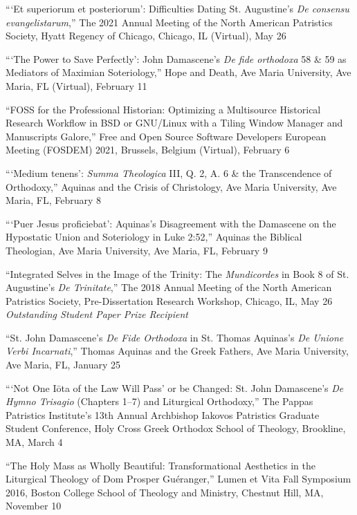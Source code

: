 \documentclass[letterpaper,12pt]{article}
\newcommand{\years}[1]{%
  {\reversemarginpar\strut\marginnote{{\small#1}}}%
}
\begin{document}
{{{{{{{{%
\years{2021}%
%
```Et superiorum et posteriorum': Difficulties Dating St. Augustine's \emph{De consensu evangelistarum},'' The 2021 Annual Meeting of the North American Patristics Society, Hyatt Regency of Chicago, Chicago, IL (Virtual), May 26 \\ [.3cm]
%
\years{2021}%
%
```The Power to Save Perfectly': John Damascene's \emph{De fide orthodoxa} 58 \& 59 as Mediators of Maximian Soteriology,'' Hope and Death, Ave Maria University, Ave Maria, FL (Virtual), February 11 \\ [.3cm]
%
\years{2021}%
%
``FOSS for the Professional Historian: Optimizing a Multisource Historical Research Workflow in BSD or GNU/Linux with a Tiling Window Manager and Manuscripts Galore,'' Free and Open Source Software Developers European Meeting (FOSDEM) 2021, Brussels, Belgium (Virtual), February 6 \\ [.3cm]
%
\years{2020}%
%
```Medium tenens': \emph{Summa Theologica} III, Q. 2, A. 6 \& the Transcendence of Orthodoxy,'' Aquinas and the Crisis of Christology, Ave Maria University, Ave Maria, FL, February 8 \\ [.3cm]
%
\years{2019}%
%
```Puer Jesus proficiebat': Aquinas's Disagreement with the Damascene on the Hypostatic Union and Soteriology in Luke 2:52,'' Aquinas the Biblical Theologian, Ave Maria University, Ave Maria, FL, February 9 \\ [.3cm]
%
\years{2018}%
%
``Integrated Selves in the Image of the Trinity: The \emph{Mundicordes} in Book 8 of St. Augustine's \emph{De Trinitate},'' The 2018 Annual Meeting of the North American Patristics Society, Pre-Dissertation Research Workshop, Chicago, IL, May 26 \\
\hfill\emph{Outstanding Student Paper Prize Recipient} \\ [.3cm]
%
\years{2018}%
%
``St. John Damascene's \emph{De Fide Orthodoxa} in St. Thomas Aquinas's \emph{De Unione Verbi Incarnati},'' Thomas Aquinas and the Greek Fathers, Ave Maria University, Ave Maria, FL, January 25 \\ [.3cm]
%
\years{2017}%
%
```Not One I\=ota of the Law Will Pass' or be Changed: St. John Damascene's \emph{De Hymno Trisagio} (Chapters 1–7) and Liturgical Orthodoxy,'' The Pappas Patristics Institute's 13th Annual Archbishop Iakovos Patristics Graduate Student Conference, Holy Cross Greek Orthodox School of Theology, Brookline, MA, March 4 \\ [.3cm]
%
\years{2017}%
%
``The Holy Mass as Wholly Beautiful: Transformational Aesthetics in the Liturgical Theology of Dom Prosper Guéranger,'' Lumen et Vita Fall Symposium 2016, Boston College School of Theology and Ministry, Chestnut Hill, MA, November 10 \\ [.3cm]
}}}}}}}}
\end{document}

